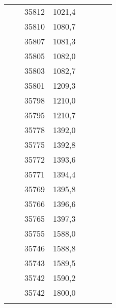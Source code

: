 \documentclass[11pt]{article}
\begin{document}
{{\begin{tabular}{|c|c|c|c|cccc}
            \cline{3-4} 
            \multicolumn{1}{c}{} &  & 35812 & 1021,4 &  &  &  & \tabularnewline
            \cline{3-4} 
            \multicolumn{1}{c}{} &  & 35810 & 1080,7 &  &  &  & \tabularnewline
            \cline{3-4} 
            \multicolumn{1}{c}{} &  & 35807 & 1081,3 &  &  &  & \tabularnewline
            \cline{3-4} 
            \multicolumn{1}{c}{} &  & 35805 & 1082,0 &  &  &  & \tabularnewline
            \cline{3-4} 
            \multicolumn{1}{c}{} &  & 35803 & 1082,7 &  &  &  & \tabularnewline
            \cline{3-4} 
            \multicolumn{1}{c}{} &  & 35801 & 1209,3 &  &  &  & \tabularnewline
            \cline{3-4} 
            \multicolumn{1}{c}{} &  & 35798 & 1210,0 &  &  &  & \tabularnewline
            \cline{3-4} 
            \multicolumn{1}{c}{} &  & 35795 & 1210,7 &  &  &  & \tabularnewline
            \cline{3-4} 
            \multicolumn{1}{c}{} &  & 35778 & 1392,0 &  &  &  & \tabularnewline
            \cline{3-4} 
            \multicolumn{1}{c}{} &  & 35775 & 1392,8 &  &  &  & \tabularnewline
            \cline{3-4} 
            \multicolumn{1}{c}{} &  & 35772 & 1393,6 &  &  &  & \tabularnewline
            \cline{3-4} 
            \multicolumn{1}{c}{} &  & 35771 & 1394,4 &  &  &  & \tabularnewline
            \cline{3-4} 
            \multicolumn{1}{c}{} &  & 35769 & 1395,8 &  &  &  & \tabularnewline
            \cline{3-4} 
            \multicolumn{1}{c}{} &  & 35766 & 1396,6 &  &  &  & \tabularnewline
            \cline{3-4} 
            \multicolumn{1}{c}{} &  & 35765 & 1397,3 &  &  &  & \tabularnewline
            \cline{3-4} 
            \multicolumn{1}{c}{} &  & 35755 & 1588,0 &  &  &  & \tabularnewline
            \cline{3-4} 
            \multicolumn{1}{c}{} &  & 35746 & 1588,8 &  &  &  & \tabularnewline
            \cline{3-4} 
            \multicolumn{1}{c}{} &  & 35743 & 1589,5 &  &  &  & \tabularnewline
            \cline{3-4} 
            \multicolumn{1}{c}{} &  & 35742 & 1590,2 &  &  &  & \tabularnewline
            \cline{3-4} 
            \multicolumn{1}{c}{} &  & 35742 & 1800,0 &  &  &  & \tabularnewline
            \cline{3-4} 
            \multicolumn{1}{c}{} & \multicolumn{1}{c}{} & \multicolumn{1}{c}{} & \multicolumn{1}{c}{} &  &  &  & \tabularnewline
        \end{tabular}
    }
}
\vspace*{\fill}
\end{document}
